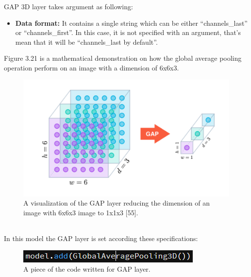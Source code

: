 \begin{itemize}
GAP 3D layer takes argument as following:\hfill \\
\noindent{}
\begin{itemize}
    \item \textbf{Data format:} It contains a single string which can be either “channels\_last” or “channels\_first”.  In this case, it is not specified with an argument, that’s mean that it will be “channels\_last by default”.\hfill \\
\end{itemize}
\newpage
Figure 3.21 is a mathematical demonstration on how the global average pooling operation perform on an image with a dimension of 6x6x3.\\
 \begin{figure}[ht]
    \centering
    \includegraphics{Figures/gap1}
    \decoRule
    \caption[A visualization of the GAP layer reducing the dimension of an image with 6x6x3 image to 1x1x3 "55"]{A visualization of the GAP layer reducing the dimension of an image with 6x6x3 image to 1x1x3 [55].}
    \label{fig:la}
    \end{figure}\hfill \\
In this model the GAP layer is set according these specifications:\\
 \begin{figure}[ht]
    \centering
    \includegraphics{Figures/GAPcode}
    \decoRule
    \caption[A piece of the code written for GAP layer.]{A piece of the code written for GAP layer.}

\end{figure}
\end{itemize}
